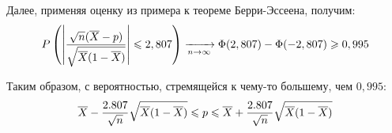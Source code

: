 \begin{example}
    Далее, применяя оценку из примера к теореме Берри-Эссеена, получим:
    \[
        P \left(\left|\frac{\sqrt{n}(\overline{X} - p)}{\sqrt{\overline{X}(1 - \overline{X})}}\right| \leqslant 2,807\right) \xrightarrow[n \to \infty]{} \Phi(2,807) -  \Phi(-2,807) \geqslant 0,995
    \]

    Таким образом, с вероятностью, стремящейся к чему-то большему, чем $0,995$:
    \[
        \overline{X} - \frac{2.807}{\sqrt{n}} \sqrt{\overline{X}(1 - \overline{X})} \leqslant p \leqslant \overline{X} + \frac{2.807}{\sqrt{n}} \sqrt{\overline{X}(1 - \overline{X})}
    \]
\end{example}